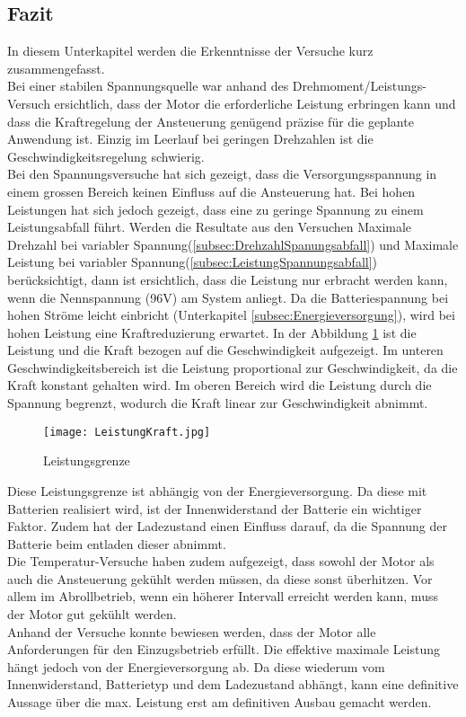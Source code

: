 \subsection{Fazit}\label{subsec:Fazit}
In diesem Unterkapitel werden die Erkenntnisse der Versuche kurz zusammengefasst.\\
Bei einer stabilen Spannungsquelle war anhand des Drehmoment/Leistungs-Versuch ersichtlich, dass der Motor die erforderliche Leistung erbringen kann und dass die Kraftregelung der Ansteuerung genügend präzise für die geplante Anwendung ist. Einzig im Leerlauf bei geringen Drehzahlen ist die Geschwindigkeitsregelung schwierig.\\
Bei den Spannungsversuche hat sich gezeigt, dass die Versorgungsspannung in einem grossen Bereich keinen Einfluss auf die Ansteuerung hat. Bei hohen Leistungen hat sich jedoch gezeigt, dass eine zu geringe Spannung zu einem Leistungsabfall führt. Werden die Resultate aus den Versuchen \glqq Maximale Drehzahl bei variabler Spannung\grqq (\ref{subsec:DrehzahlSpanungsabfall}) und \glqq Maximale Leistung bei variabler Spannung\grqq (\ref{subsec:LeistungSpannungsabfall}) berücksichtigt, dann ist ersichtlich, dass die Leistung nur erbracht werden kann, wenn die Nennspannung (96V) am System anliegt. Da die Batteriespannung bei hohen Ströme leicht einbricht (Unterkapitel \ref{subsec:Energieversorgung}), wird bei hohen Leistung eine Kraftreduzierung erwartet. In der Abbildung \ref{fig:LeistungKraft} ist die Leistung und die Kraft bezogen auf die Geschwindigkeit aufgezeigt. Im unteren Geschwindigkeitsbereich ist die Leistung proportional zur Geschwindigkeit, da die Kraft konstant gehalten wird. Im oberen Bereich wird die Leistung durch die Spannung begrenzt, wodurch die Kraft linear zur Geschwindigkeit abnimmt.

\begin{figure}[H]
	\centering
	\texttt{[image: LeistungKraft.jpg]}
	\caption{Leistungsgrenze}\label{fig:LeistungKraft}
\end{figure}

Diese Leistungsgrenze ist abhängig von der Energieversorgung. Da diese mit Batterien realisiert wird, ist der Innenwiderstand der Batterie ein wichtiger Faktor. Zudem hat der Ladezustand einen Einfluss darauf, da die Spannung der Batterie beim entladen dieser abnimmt.\\
Die Temperatur-Versuche haben zudem aufgezeigt, dass sowohl der Motor als auch die Ansteuerung gekühlt werden müssen, da diese sonst überhitzen. Vor allem im Abrollbetrieb, wenn ein höherer Intervall erreicht werden kann, muss der Motor gut gekühlt werden.\\

Anhand der Versuche konnte bewiesen werden, dass der Motor alle Anforderungen für den Einzugsbetrieb erfüllt. Die effektive maximale Leistung hängt jedoch von der Energieversorgung ab. Da diese wiederum vom Innenwiderstand, Batterietyp und dem Ladezustand abhängt, kann eine definitive Aussage über die max. Leistung erst am definitiven Ausbau gemacht werden.